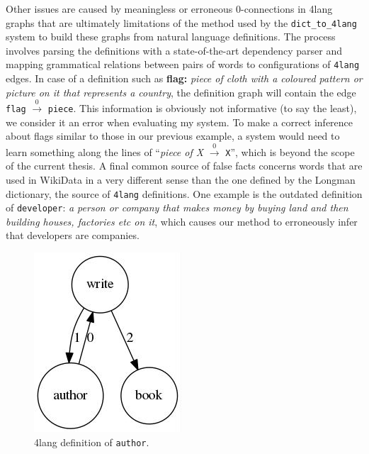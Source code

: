 Other issues are caused by meaningless or erroneous 0-connections in 4lang graphs
that are ultimately limitations of the method used by the \texttt{dict\_to\_4lang}
system to build these graphs from natural language definitions. The process involves parsing
the definitions with a state-of-the-art dependency parser and mapping grammatical
relations between pairs of words to configurations of \texttt{4lang} edges.
In case of a definition such as \textbf{flag:}
\textit{piece of cloth with a coloured pattern or picture on it that represents
	a country}, the definition graph will contain the edge
\texttt{flag} $\xrightarrow0$ \texttt{piece}. This information
is obviously not informative (to say the least), we consider it an error
when evaluating my system.
To make a correct inference about flags similar to those in our previous example,
a system would need to learn something along the lines of
``\textit{piece of X} $\xrightarrow0$ \texttt{X}'', which is beyond the scope of
the current thesis. 
A final common source of false facts concerns words that are used in WikiData
in a very different sense than the one defined by the Longman dictionary, the source
of \texttt{4lang} definitions. One example is the outdated definition of
\texttt{developer}: \textit{a person or company that makes money by buying land
	and then building houses, factories etc on it}, which causes our method to erroneously
infer that developers are companies.

\begin{figure}
	\centering
	\includegraphics[scale=0.5]{figures/author.jpg}
	\caption{4lang definition of \texttt{author}.}
	\label{fig:author}
\end{figure}

